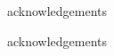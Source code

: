 \vspace*{7cm}
\begin{center}
acknowledgements
\end{center}
\vspace{0.6cm}
\begin{center}
acknowledgements
\end{center}
